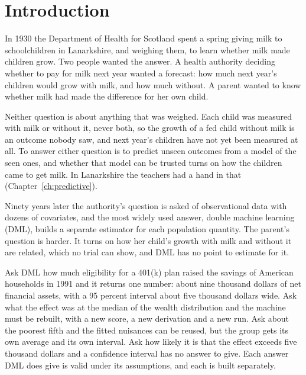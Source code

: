 \chapter*{Introduction}\label{ch:intro}

In 1930 the Department of Health for Scotland spent a spring giving milk to schoolchildren in Lanarkshire, and weighing them, to learn whether milk made children grow. Two people wanted the answer. A health authority deciding whether to pay for milk next year wanted a forecast: how much next year's children would grow with milk, and how much without. A parent wanted to know whether milk had made the difference for her own child.

Neither question is about anything that was weighed. Each child was measured with milk or without it, never both, so the growth of a fed child without milk is an outcome nobody saw, and next year's children have not yet been measured at all. To answer either question is to predict unseen outcomes from a model of the seen ones, and whether that model can be trusted turns on how the children came to get milk. In Lanarkshire the teachers had a hand in that (Chapter~\ref{ch:predictive}).

Ninety years later the authority's question is asked of observational data with dozens of covariates, and the most widely used answer, double machine learning (DML), builds a separate estimator for each population quantity. The parent's question is harder. It turns on how her child's growth with milk and without it are related, which no trial can show, and DML has no point to estimate for it.

Ask DML how much eligibility for a 401(k) plan raised the savings of American households in 1991 and it returns one number: about nine thousand dollars of net financial assets, with a 95 percent interval about five thousand dollars wide. Ask what the effect was at the median of the wealth distribution and the machine must be rebuilt, with a new score, a new derivation and a new run. Ask about the poorest fifth and the fitted nuisances can be reused, but the group gets its own average and its own interval. Ask how likely it is that the effect exceeds five thousand dollars and a confidence interval has no answer to give. Each answer DML does give is valid under its assumptions, and each is built separately.

